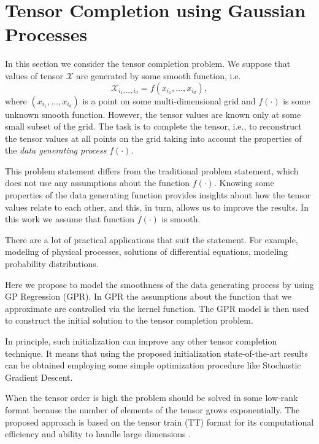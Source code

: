 \section{Tensor Completion using Gaussian Processes}
\label{sec:tensor_completion_using_gp}

In this section we consider the tensor completion problem.
We suppose that values of tensor $\mathcal{X}$ are generated by some smooth function, i.e.
\[
\mathcal{X}_{i_1, \ldots, i_d} = f(x_{i_1}, \ldots, x_{i_d}),
\]
where $(x_{i_1}, \ldots, x_{i_d})$ is a point on
some multi-dimensional grid and $f(\cdot)$ is some
unknown smooth function.
However, the tensor values are known only at some small subset of the grid.
The task is to complete the tensor, i.e., to reconstruct the tensor values at all points on the grid taking into account the properties of the {\em data generating process} $f(\cdot)$.

This problem statement differs from the traditional problem statement, which does not use any assumptions about the function $f(\cdot)$.
Knowing some properties of the data generating function provides insights about how the tensor values relate to each other, and this, in turn, allows us to improve the results.
In this work we assume that function $f(\cdot)$ is smooth.

There are a lot of practical applications that suit the statement.
For example, modeling of physical processes, solutions of differential equations, modeling probability distributions.

Here we propose to model the smoothness of the data generating process by using
GP Regression (GPR).
In GPR the assumptions about the function that we approximate are controlled via the kernel
function.
The GPR model is then used to construct the initial solution to the tensor completion problem.

In principle, such initialization can improve any other tensor completion technique.
It means that using the proposed initialization state-of-the-art results
can be obtained employing some simple optimization procedure like Stochastic Gradient Descent.


When the tensor order is high the problem should be solved in some low-rank
format because the number of elements of the tensor grows exponentially.
The proposed approach is based on the tensor train (TT) format for its
computational efficiency and ability to handle large dimensions \citep{oseledets2010tt}.

